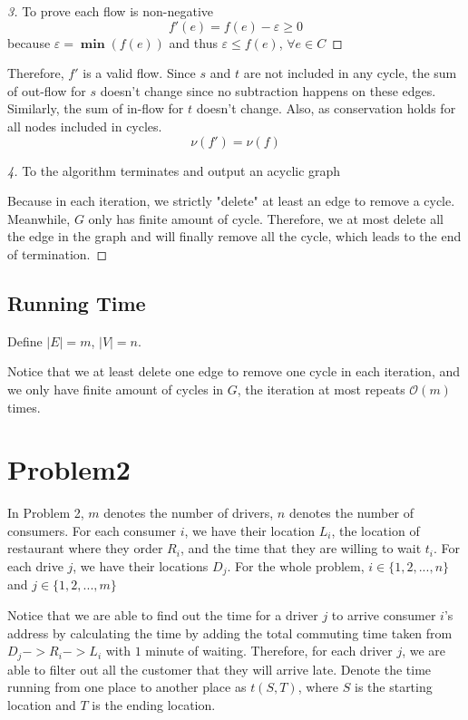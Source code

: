 \documentclass[openany]{article}
\begin{document}
\begin{proof}[3]{To prove each flow is non-negative}
    \[f'(e) = f(e) - \varepsilon \geq 0\] because $\varepsilon = \mathbf{\min}(f(e))$ and thus $\varepsilon \leq f(e)$, $\forall e \in C$
    
\end{proof}

Therefore, $f'$ is a valid flow. Since $s$ and $t$ are not included in any cycle, the sum of out-flow for $s$ doesn't change since no subtraction happens on these edges. Similarly, the sum of in-flow for $t$ doesn't change. Also, as conservation holds for all nodes included in cycles.
\[\nu(f') = \nu(f)\]

\begin{proof}[4]{To the algorithm terminates and output an acyclic graph}

Because in each iteration, we strictly "delete" at least an edge to remove a cycle. Meanwhile, $G$ only has finite amount of cycle. Therefore, we at most delete all the edge in the graph and will finally remove all the cycle, which leads to the end of termination.
    
\end{proof}

\subsection*{Running Time}
Define $|E| = m$, $|V| = n$.

Notice that we at least delete one edge to remove one cycle in each iteration, and we only have finite amount of cycles in $G$, the iteration at most repeats $\mathcal{O}(m)$ times. 

\section*{Problem2}
In Problem 2, $m$ denotes the number of drivers, $n$ denotes the number of consumers. For each consumer $i$, we have their location $L_i$, the location of restaurant where they order $R_i$, and the time that they are willing to wait $t_i$. For each drive $j$, we have their locations $D_j$. For the whole problem, $i \in \{1,2,...,n\}$ and $j \in \{1,2,...,m\}$

Notice that we are able to find out the time for a driver $j$ to arrive consumer $i$'s address by calculating the time by adding the total commuting time taken from $D_j -> R_i -> L_i $ with $1$ minute of waiting. Therefore, for each driver $j$, we are able to filter out all the customer that they will arrive late. Denote the time running from one place to another place as $t(S,T)$, where $S$ is the starting location and $T$ is the ending location.
\end{document}
